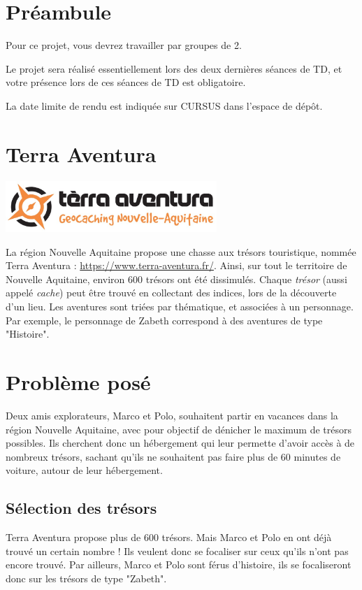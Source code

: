 \documentclass[11pt,a4paper]{article}
\begin{document}
\section{Préambule}

Pour ce projet, vous devrez travailler par groupes de 2.

Le projet sera réalisé essentiellement lors des deux dernières séances de TD, et votre présence lors de ces séances de TD est obligatoire.

La date limite de rendu est indiquée sur CURSUS dans l’espace de dépôt.

\section{Terra Aventura}

\begin{center}
\includegraphics[width=8cm]{ProjetTerraAventura/logo.jpg}
\end{center}

La région Nouvelle Aquitaine propose une chasse aux trésors touristique, nommée Terra Aventura : \url{https://www.terra-aventura.fr/}. Ainsi, sur tout le territoire de Nouvelle Aquitaine, environ 600 trésors ont été dissimulés. Chaque \emph{trésor} (aussi appelé \emph{cache}) peut être trouvé en collectant des indices, lors de la découverte d'un lieu. Les aventures sont triées par thématique, et associées à un personnage. Par exemple, le personnage de Zabeth correspond à des aventures de type "Histoire". 

\section{Problème posé}

Deux amis explorateurs, Marco et Polo, souhaitent partir en vacances dans la région Nouvelle Aquitaine, avec pour objectif de dénicher le maximum de trésors possibles. Ils cherchent donc un hébergement qui leur permette d'avoir accès à de nombreux trésors, sachant qu'ils ne souhaitent pas faire plus de 60 minutes de voiture, autour de leur hébergement. 

\subsection{Sélection des trésors}\label{tresor}
Terra Aventura propose plus de 600 trésors. Mais Marco et Polo en ont déjà trouvé un certain nombre ! Ils veulent donc se focaliser sur ceux qu'ils n'ont pas encore trouvé. 
Par ailleurs, Marco et Polo sont férus d'histoire, ils se focaliseront donc sur les trésors de type "Zabeth". 
\end{document}
